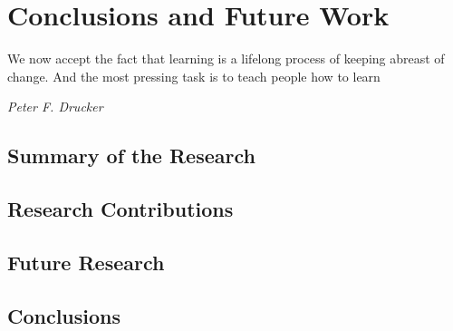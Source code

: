 \chapter{Conclusions and Future Work\label{cha:conclusion}}
\epigraph{We now accept the fact that learning is a lifelong process of keeping abreast of
change. And the most pressing task is to teach people how to learn}{\textit{Peter F. Drucker}}

\section{Summary of the Research}

\section{Research Contributions}

\section{Future Research}

\section{Conclusions}
